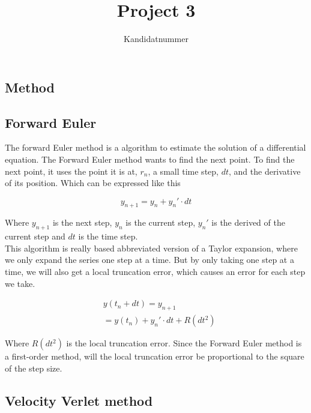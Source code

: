 \documentclass{article}
\begin{document}
\title{Project 3}
\author{Kandidatnummer}

\maketitle

\begin{abstract}

\end{abstract}

\begin{multicols}{2}

\section{Method}

\subsection{Forward Euler}
The forward Euler method is a algorithm to estimate the solution of a differential equation. The Forward Euler method wants to find the next point. To find the next point, it uses the point it is at, $r_n$, a small time step, $dt$, and the derivative of its position. Which can be expressed like this

\begin{equation}
y_{n+1}=y_n + y_n'\cdot dt
\label{eq:yn1}
\end{equation}

Where $y_{n+1}$ is the next step, $y_n$ is the current step, $y_n'$ is the derived of the current step and $dt$ is the time step.\\
This algorithm is really based abbreviated version of a Taylor expansion, where we only expand the series one step at a time. But by only taking one step at a time, we will also get a local truncation error, which causes an error for each step we take. 

\begin{equation}
\begin{split}
&y(t_n+dt)=y_{n+1}\\
&=y(t_n)+y_n'\cdot dt + R(dt^2)
\end{split}
\label{eq:ytndt}
\end{equation} 

Where $R(dt^2)$ is the local truncation error. Since the Forward Euler method is a first-order method, will the local truncation error be proportional to the square of the step size. 

\subsection{Velocity Verlet method}


\end{multicols}
\end{document}
